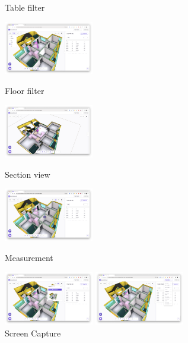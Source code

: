 \begin{itemize}
\begin{itemize}[label=$\star$]
\begin{figure}[!ht]
\begin{fullwidth}
{					            \caption*{Table filter}
				            }
				            \parbox{0.35\textwidth}{
					            \centering
					            \includegraphics[width=0.35\textwidth]{images/builderhub-curation-filter-floor.png}
					            \caption*{Floor filter}
				            }\qquad
				            \parbox{0.35\textwidth}{
					            \centering
					            \includegraphics[width=0.35\textwidth]{images/builderhub-curation-section-view.png}
					            \caption*{Section view}
				            }\qquad
				            \parbox{0.35\textwidth}{
					            \centering
					            \includegraphics[width=0.35\textwidth]{images/builderhub-curation-measurement.png}
					            \caption*{Measurement}
				            }\qquad
				            \parbox{0.35\textwidth}{
					            \centering
					            \includegraphics[width=0.35\textwidth]{images/builderhub-curation-screenshot.png}
					            \caption*{Screen Capture}
				            }
				            \parbox{0.35\textwidth}{
					            \centering
					            \includegraphics[width=0.35\textwidth]{images/builderhub-curation-download.png}
}
\end{fullwidth}
\end{figure}
\end{itemize}
\end{itemize}
